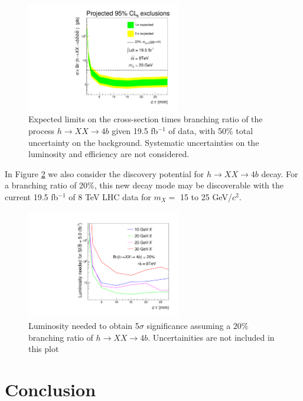\documentclass{JHEP3}
\begin{document}
\begin{figure}[ht]
\centering
\includegraphics[width=0.6\textwidth]{X20.pdf}
\caption{Expected limits on the cross-section times branching ratio of the process $h \rightarrow XX
  \rightarrow 4b$ given 19.5 fb$^{-1}$ of data, with 50\% total uncertainty on the background. Systematic uncertainties on the luminosity and efficiency
  are not considered.}
\label{fig:limits}
\end{figure}

In Figure \ref{fig:discovery} we also consider the discovery potential for $h\rightarrow XX \rightarrow 4b$ decay. For a branching ratio of 20\%, this new decay mode may be discoverable with the current 19.5 fb$^{-1}$ of 8 TeV LHC data for $m_X = $ 15 to 25 GeV/$c^2$. 

\begin{figure}[ht]
\centering
\includegraphics[width=0.6\textwidth]{luminosity.pdf}
\caption{Luminosity needed to obtain 5$\sigma$ significance assuming a $20\%$ branching ratio of $h \rightarrow XX
  \rightarrow 4b$. Uncertainities are not included in this plot}
\label{fig:discovery}
\end{figure}

\section{Conclusion}
\end{document}
